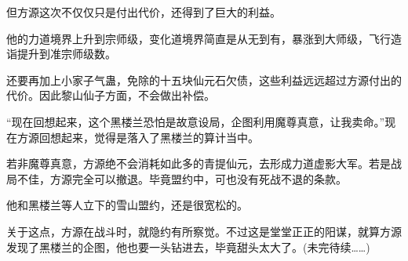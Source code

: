 \begin{this_body}
但方源这次不仅仅只是付出代价，还得到了巨大的利益。

他的力道境界上升到宗师级，变化道境界简直是从无到有，暴涨到大师级，飞行造诣提升到准宗师级数。

还要再加上小家子气蛊，免除的十五块仙元石欠债，这些利益远远超过方源付出的代价。因此黎山仙子方面，不会做出补偿。

“现在回想起来，这个黑楼兰恐怕是故意设局，企图利用魔尊真意，让我卖命。”现在方源回想起来，觉得是落入了黑楼兰的算计当中。

若非魔尊真意，方源绝不会消耗如此多的青提仙元，去形成力道虚影大军。若是战局不佳，方源完全可以撤退。毕竟盟约中，可也没有死战不退的条款。

他和黑楼兰等人立下的雪山盟约，还是很宽松的。

关于这点，方源在战斗时，就隐约有所察觉。不过这是堂堂正正的阳谋，就算方源发现了黑楼兰的企图，他也要一头钻进去，毕竟甜头太大了。(未完待续……)

\end{this_body}

